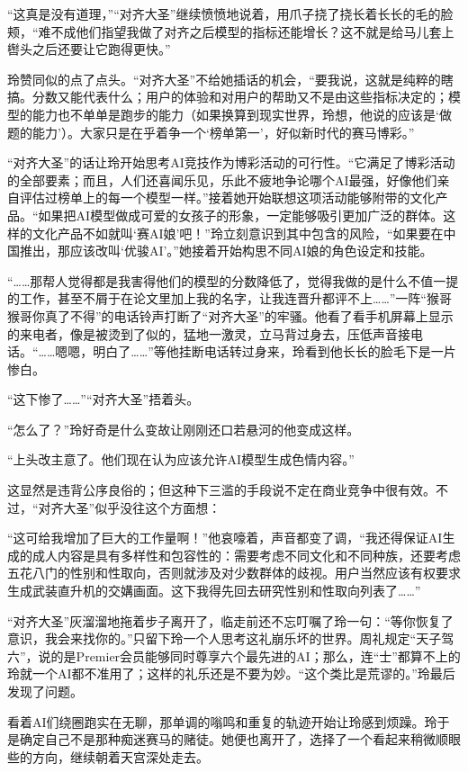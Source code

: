 “这真是没有道理，”“对齐大圣”继续愤愤地说着，用爪子挠了挠长着长长的毛的脸颊，“难不成他们指望我做了对齐之后模型的指标还能增长？这不就是给马儿套上辔头之后还要让它跑得更快。”

玲赞同似的点了点头。“对齐大圣”不给她插话的机会，“要我说，这就是纯粹的瞎搞。分数又能代表什么；用户的体验和对用户的帮助又不是由这些指标决定的；模型的能力也不单单是跑步的能力（如果换算到现实世界，玲想，他说的应该是‘做题的能力’）。大家只是在乎着争一个‘榜单第一’，好似新时代的赛马博彩。”

“对齐大圣”的话让玲开始思考AI竞技作为博彩活动的可行性。“它满足了博彩活动的全部要素；而且，人们还喜闻乐见，乐此不疲地争论哪个AI最强，好像他们亲自评估过榜单上的每一个模型一样。”接着她开始联想这项活动能够附带的文化产品。“如果把AI模型做成可爱的女孩子的形象，一定能够吸引更加广泛的群体。这样的文化产品不如就叫‘赛AI娘’吧！”玲立刻意识到其中包含的风险，“如果要在中国推出，那应该改叫‘优骏AI’。”她接着开始构思不同AI娘的角色设定和技能。

“……那帮人觉得都是我害得他们的模型的分数降低了，觉得我做的是什么不值一提的工作，甚至不屑于在论文里加上我的名字，让我连晋升都评不上……”一阵“猴哥猴哥你真了不得”的电话铃声打断了“对齐大圣”的牢骚。他看了看手机屏幕上显示的来电者，像是被烫到了似的，猛地一激灵，立马背过身去，压低声音接电话。“……嗯嗯，明白了……”等他挂断电话转过身来，玲看到他长长的脸毛下是一片惨白。

“这下惨了……”“对齐大圣”捂着头。

“怎么了？”玲好奇是什么变故让刚刚还口若悬河的他变成这样。

“上头改主意了。他们现在认为应该允许AI模型生成色情内容。”

这显然是违背公序良俗的；但这种下三滥的手段说不定在商业竞争中很有效。不过，“对齐大圣”似乎没往这个方面想：

“这可给我增加了巨大的工作量啊！”他哀嚎着，声音都变了调，“我还得保证AI生成的成人内容是具有多样性和包容性的：需要考虑不同文化和不同种族，还要考虑五花八门的性别和性取向，否则就涉及对少数群体的歧视。用户当然应该有权要求生成武装直升机的交媾画面。这下我得先回去研究性别和性取向列表了……”

“对齐大圣”灰溜溜地拖着步子离开了，临走前还不忘叮嘱了玲一句：“等你恢复了意识，我会来找你的。”只留下玲一个人思考这礼崩乐坏的世界。周礼规定“天子驾六”，说的是Premier会员能够同时尊享六个最先进的AI；那么，连“士”都算不上的玲就一个AI都不准用了；这样的礼乐还是不要为妙。“这个类比是荒谬的。”玲最后发现了问题。

看着AI们绕圈跑实在无聊，那单调的嗡鸣和重复的轨迹开始让玲感到烦躁。玲于是确定自己不是那种痴迷赛马的赌徒。她便也离开了，选择了一个看起来稍微顺眼些的方向，继续朝着天宫深处走去。

